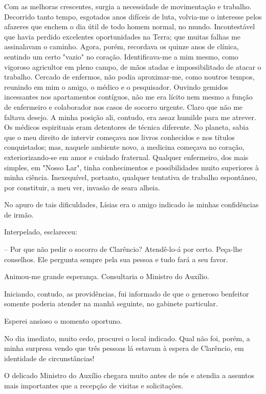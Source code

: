 \documentclass[portuguese,12pt,a4paper]{scrbook}
\begin{document}
	Com as melhoras crescentes, surgia a necessidade de movimentação e trabalho. Decorrido tanto tempo, esgotados anos difíceis de luta, volvia-me o interesse pelos afazeres que enchem o dia útil de todo homem normal, no mundo. Incontestável que havia perdido excelentes oportunidades na Terra; que muitas falhas me assinalavam o caminho. Agora, porém, recordava os quinze anos de clínica, sentindo um certo "vazio" no coração. Identificava-me a mim mesmo, como vigoroso agricultor em pleno campo, de mãos atadas e impossibilitado de atacar o trabalho. Cercado de enfermos, não podia aproximar-me, como noutros tempos, reunindo em mim o amigo, o médico e o pesquisador. Ouvindo gemidos incessantes nos apartamentos contíguos, não me era lícito nem mesmo a função de enfermeiro e colaborador nos casos de socorro urgente. Claro que não me faltava desejo. A minha posição ali, contudo, era assaz humilde para me atrever. Os médicos espirituais eram detentores de técnica diferente. No planeta, sabia que o meu direito de intervir começava nos livros conhecidos e nos títulos conquistados; mas, naquele ambiente novo, a medicina começava no coração, exteriorizando-se em amor e cuidado fraternal. Qualquer enfermeiro, dos mais simples, em "Nosso Lar", tinha conhecimentos e possibilidades muito superiores à minha ciência. Inexequível, portanto, qualquer tentativa de trabalho espontâneo, por constituir, a meu ver, invasão de seara alheia.
	
	No apuro de tais dificuldades, Lísias era o amigo indicado às minhas confidências de irmão.
	
	Interpelado, esclareceu:
	
	
	– Por que não pedir o socorro de Clarêncio? Atendê-lo-á por certo. Peça-lhe conselhos. Ele pergunta sempre pela sua pessoa e tudo fará a seu favor.
	
	Animou-me grande esperança. Consultaria o Ministro do Auxílio.
	
	Iniciando, contudo, as providências, fui informado de que o generoso benfeitor somente poderia atender na manhã seguinte, no gabinete particular.
	
	Esperei ansioso o momento oportuno.
	
	No dia imediato, muito cedo, procurei o local indicado. Qual não foi, porém, a minha surpresa vendo que três pessoas lá estavam à espera de Clarêncio, em identidade de circunstâncias!
	
	O delicado Ministro do Auxílio chegara muito antes de nós e atendia a assuntos mais importantes que a recepção de visitas e solicitações.
	
\end{document}
